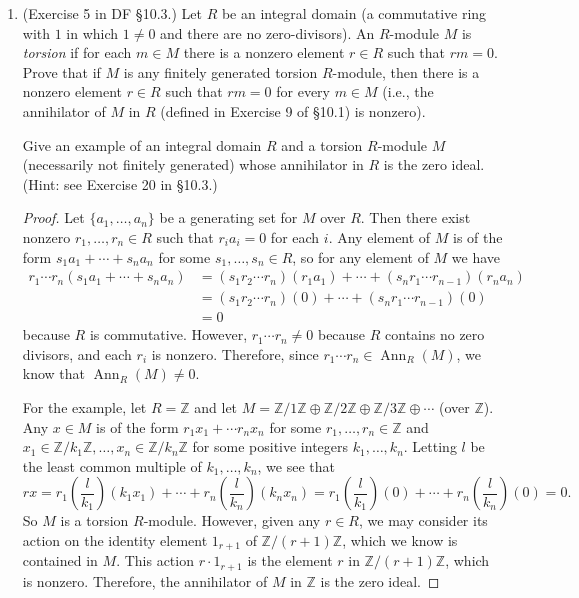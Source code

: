 \documentclass[10pt]{article}
\newcommand{\Z}{\mathbb{Z}}
\DeclareMathOperator*{\Ann}{Ann}
\begin{document}
\begin{enumerate}
\item (Exercise 5 in DF \S 10.3.)  Let $R$ be an integral domain (a commutative ring with $1$ in which $1 \neq 0$ and there are no zero-divisors).  An $R$-module $M$ is \emph{torsion} if for each $m \in M$ there is a nonzero element $r \in R$ such that $rm=0$.  Prove that if $M$ is any finitely generated torsion $R$-module, then there is a nonzero element $r \in R$ such that $rm=0$ for every $m \in M$ (i.e., the annihilator of $M$ in $R$ (defined in Exercise 9 of \S 10.1) is nonzero).

Give an example of an integral domain $R$ and a torsion $R$-module $M$ (necessarily not finitely generated) whose annihilator in $R$ is the zero ideal.  (Hint: see Exercise 20 in \S 10.3.)

\begin{proof}
Let $\{a_1 , \dots , a_n \}$ be a generating set for $M$ over $R$.  Then there exist nonzero $r_1, \dots, r_n \in R$ such that $r_i a_i = 0$ for each $i$.  Any element of $M$ is of the form $s_1a_1 + \cdots + s_na_n$ for some $s_1, \dots, s_n \in R$, so for any element of $M$ we have
\begin{align*}
r_1 \cdots r_n (s_1 a_1 + \cdots + s_n a_n)
&= (s_1r_2 \cdots r_n) (r_1 a_1) + \cdots + (s_n r_1 \cdots r_{n-1}) (r_na_n)
\\
&= (s_1r_2 \cdots r_n) (0) + \cdots + (s_n r_1 \cdots r_{n-1}) (0)
\\
&= 0
\end{align*}
because $R$ is commutative.  However, $r_1 \cdots r_n \neq 0$ because $R$ contains no zero divisors, and each $r_i$ is nonzero.  Therefore, since $r_1 \cdots r_n \in \Ann_R (M)$, we know that $\Ann_R (M) \neq 0$.

For the example, let $R = \Z$ and let $M = \Z / 1 \Z \oplus \Z / 2 \Z \oplus \Z / 3 \Z \oplus \cdots$ (over $\Z$).  Any $x \in M$ is of the form $r_1 x_1 + \cdots r_n x_n$ for some $r_1, \dots, r_n \in \Z$ and $x_1 \in \Z / k_1 \Z, \dots , x_n \in \Z / k_n \Z$ for some positive integers $k_1, \dots , k_n$.  Letting $l$ be the least common multiple of $k_1, \dots , k_n$, we see that
$$
rx = r_1 \left(\frac{l}{k_1} \right) \left(k_1x_1 \right) + \cdots + r_n \left(\frac{l}{k_n} \right) \left(k_n x_n \right)
= r_1 \left(\frac{l}{k_1} \right) (0) + \cdots + r_n \left(\frac{l}{k_n} \right) (0) = 0.
$$
So $M$ is a torsion $R$-module.  However, given any $r \in R$, we may consider its action on the identity element $1_{r+1}$ of $\Z / (r+1)\Z$, which we know is contained in $M$.  This action $r \cdot 1_{r+1}$ is the element $r$ in $\Z / (r+1)\Z$, which is nonzero.  Therefore, the annihilator of $M$ in $\Z$ is the zero ideal.
\end{proof}


\end{enumerate}
\end{document}
